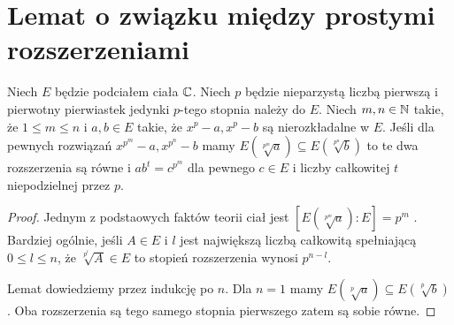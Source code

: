 \section{Lemat o związku między prostymi rozszerzeniami}
\begin{lemma}
  Niech $E$ będzie podciałem ciała $\mathbb{C}$. Niech $p$ będzie nieparzystą liczbą
  pierwszą i pierwotny pierwiastek jedynki $p$-tego stopnia należy do $E$. Niech
  $m, n \in \mathbb{N}$ takie, że $1 \leq m \leq n$ i $a, b \in E$ takie, że $x^p - a,
  x^p - b$ są nierozkładalne w $E$. Jeśli dla pewnych rozwiązań $x^{p^m} - a,
  x^{p^n} -b$ mamy $E\left(\sqrt[p^m]{a}\right)  \subseteq
  E\left(\sqrt[p^n]{b}\right)$ to te dwa rozszerzenia są równe i $ab^t =
  c^{p^m}$ dla pewnego $c \in E$ i liczby całkowitej $t$ niepodzielnej przez
  $p$. \label{lem:associated_extensions}
\end{lemma}
\begin{proof}
  Jednym z podstaowych faktów teorii ciał jest
  $\left[E\left(\sqrt[p^m]{a}\right):E\right] = p^m$ 
  \cite[Twierdzenie 13.1.4]{dum04}.
  Bardziej ogólnie, jeśli $A \in E$ i $l$ jest największą liczbą całkowitą
  spełniającą $0 \leq l \leq n$, że $\sqrt[p^l]{A} \in E$ to stopień
  rozszerzenia wynosi $p^{n-l}$.

  Lemat dowiedziemy przez indukcję po $n$. Dla $n=1$ mamy 
  $E\left(\sqrt[p]{a}\right) \subseteq
  E\left(\sqrt[p]{b}\right)$. Oba rozszerzenia są tego samego stopnia
  pierwszego zatem są sobie równe.
\end{proof}

